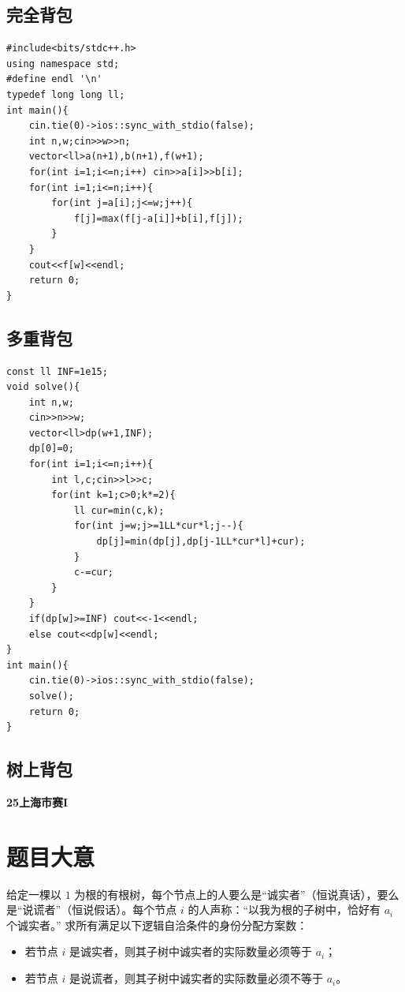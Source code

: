 \documentclass[11pt,a4paper,twocolumn]{ctexart}  %
\begin{document}
\subsection{完全背包}
\begin{lstlisting}[caption={朴素完全背包}]
#include<bits/stdc++.h>
using namespace std;
#define endl '\n'
typedef long long ll;
int main(){
    cin.tie(0)->ios::sync_with_stdio(false);
    int n,w;cin>>w>>n;
    vector<ll>a(n+1),b(n+1),f(w+1);
    for(int i=1;i<=n;i++) cin>>a[i]>>b[i];
    for(int i=1;i<=n;i++){
        for(int j=a[i];j<=w;j++){
            f[j]=max(f[j-a[i]]+b[i],f[j]);
        }
    }
    cout<<f[w]<<endl;
    return 0;
}
\end{lstlisting}
\subsection{多重背包}
\begin{lstlisting}[caption={二进制优化多重背包}]
const ll INF=1e15;
void solve(){
    int n,w;
    cin>>n>>w;
    vector<ll>dp(w+1,INF);
    dp[0]=0;
    for(int i=1;i<=n;i++){
        int l,c;cin>>l>>c;
        for(int k=1;c>0;k*=2){
            ll cur=min(c,k);
            for(int j=w;j>=1LL*cur*l;j--){
                dp[j]=min(dp[j],dp[j-1LL*cur*l]+cur);
            }
            c-=cur;
        }
    }
    if(dp[w]>=INF) cout<<-1<<endl;
    else cout<<dp[w]<<endl;
}
int main(){
    cin.tie(0)->ios::sync_with_stdio(false);
    solve();
    return 0;
}
\end{lstlisting}

\subsection{树上背包}

\textbf{25上海市赛I}

\section*{题目大意}
给定一棵以 $1$ 为根的有根树，每个节点上的人要么是“诚实者”（恒说真话），要么是“说谎者”（恒说假话）。每个节点 $i$ 的人声称：“以我为根的子树中，恰好有 $a_i$ 个诚实者。”
求所有满足以下逻辑自洽条件的身份分配方案数：
\begin{itemize}
    \item 若节点 $i$ 是诚实者，则其子树中诚实者的实际数量必须等于 $a_i$；
    \item 若节点 $i$ 是说谎者，则其子树中诚实者的实际数量必须不等于 $a_i$。
\end{itemize}
\end{document}
